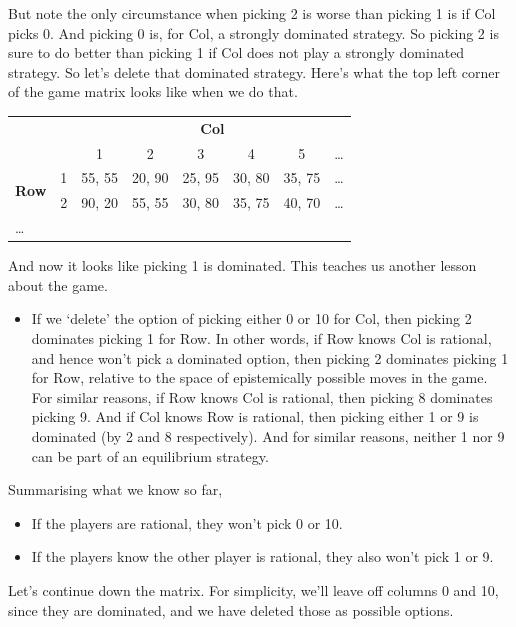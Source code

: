 \documentclass[openany]{book}
\begin{document}
But note the only circumstance when picking 2 is worse than picking 1 is if Col picks 0. And picking 0 is, for Col, a strongly dominated strategy. So picking 2 is sure to do better than picking 1 if Col does not play a strongly dominated strategy. So let's delete that dominated strategy. Here's what the top left corner of the game matrix looks like when we do that.

\begin{center}
\begin{tabular}{l r | c c c c c c}
& & \multicolumn{6}{c}{\textbf{Col}} \\
& & 1 & 2 & 3 & 4 & 5 & \dots  \\ \hline
\multirow{2}{*}{\textbf{Row}} & 1 & 55, 55 & 20, 90 & 25, 95 & 30, 80 & 35, 75 & \dots \\
& 2 & 90, 20 & 55, 55 & 30, 80 & 35, 75 & 40, 70 &  \dots \\
\dots 
\end{tabular}
\end{center}
And now it looks like picking 1 is dominated. This teaches us another lesson about the game.

\begin{itemize}
\item If we `delete' the option of picking either 0 or 10 for Col, then picking 2 dominates picking 1 for Row. In other words, if Row knows Col is rational, and hence won't pick a dominated option, then picking 2 dominates picking 1 for Row, relative to the space of epistemically possible moves in the game. For similar reasons, if Row knows Col is rational, then picking 8 dominates picking 9. And if Col knows Row is rational, then picking either 1 or 9 is dominated (by 2 and 8 respectively). And for similar reasons, neither 1 nor 9 can be part of an equilibrium strategy.
\end{itemize}
Summarising what we know so far,

\begin{itemize}
\item If the players are rational, they won't pick 0 or 10.
\item If the players know the other player is rational, they also won't pick 1 or 9.
\end{itemize}
Let's continue down the matrix. For simplicity, we'll leave off columns 0 and 10, since they are dominated, and we have deleted those as possible options.
\end{document}
